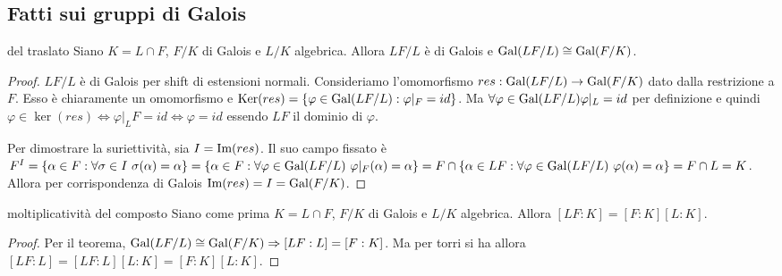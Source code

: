 \subsection{Fatti sui gruppi di Galois}
\begin{minipage}{0.5\textwidth}  
\end{minipage}\hfill
\begin{minipage}{0.5\textwidth}
\begin{theorem}{del traslato}
    Siano $K = L\cap F$, $F/K$ di Galois e $L/K$ algebrica. Allora $LF/L$ è di Galois e $\text{Gal}(LF/L) \cong \text{Gal}(F/K)$.
\end{theorem}
\end{minipage}\hfill
\begin{proof}
    $LF/L$ è di Galois per shift di estensioni normali.
    Consideriamo l'omomorfismo $res: \text{Gal}(LF/L) \rightarrow \text{Gal}(F/K)$ dato dalla restrizione a $F$. Esso è chiaramente un omomorfismo e $\text{Ker}(res) = \{ \varphi \in \text{Gal}(LF/L) : \varphi|_F = id \} $. Ma $\forall \varphi \in \text{Gal}(LF/L) \varphi|_L = id$ per definizione e quindi $\varphi \in \ker(res) \iff \varphi|_LF = id \iff \varphi = id$ essendo $LF$ il dominio di $\varphi$.
    
    Per dimostrare la suriettività, sia $I = \text{Im}(res)$.
    Il suo campo fissato è $F^I = \{\alpha \in F : \forall \sigma \in I \ \sigma(\alpha) = \alpha \} = \{\alpha \in F : \forall \varphi \in \Gal(LF/L) \ \varphi|_F(\alpha) = \alpha \} = F \cap \{\alpha \in LF : \forall \varphi \in \Gal(LF/L) \ \varphi(\alpha) = \alpha \} = F \cap L = K$. Allora per corrispondenza di Galois $ \text{Im}(res) = I = \text{Gal}(F/K)$. 
\end{proof}
\begin{corollary}{moltiplicatività del composto}
    Siano come prima $K = L\cap F$, $F/K$ di Galois e $L/K$ algebrica. Allora $[LF:K] = [F:K][L:K]$.
\end{corollary}
\begin{proof}
    Per il teorema, $\text{Gal}(LF/L) \cong \text{Gal}(F/K) \Rightarrow [LF:L] = [F:K]$. Ma per torri si ha allora $[LF:L]=[LF:L][L:K] = [F:K][L:K]$. 
\end{proof}
